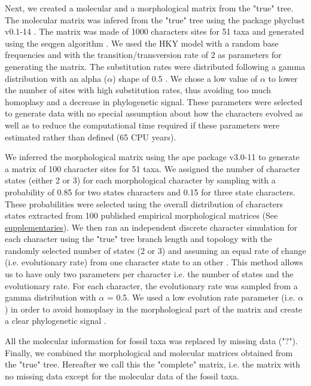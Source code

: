 \documentclass[12pt,letterpaper]{article}
\begin{document}
Next, we created a molecular and a morphological matrix from the "true" tree.
The molecular matrix was infered from the "true" tree using the package phyclust v0.1-14 \citep{chen2011}.
The matrix was made of 1000 characters sites for 51 taxa and generated using the seqgen algorithm \citep{ranbaut1997seqgen}.
We used the HKY model \citep{HKY85} with a random base frequencies and with the transition/transversion rate of 2 \citep{douadycomparison2003} as parameters for generating the matrix.
The substitution rates were distributed following a gamma distribution with an alpha ($\alpha$) shape of 0.5 \citep{yangamong-site1996}.
We chose a low value of $\alpha$ to lower the number of sites with high substitution rates, thus avoiding too much homoplasy and a decrease in phylogenetic signal.
These parameters were selected to generate data with no special assumption about how the characters evolved as well as to reduce the computational time required if these parameters were estimated rather than defined (65 CPU years).

We inferred the morphological matrix using the ape package v3.0-11 \citep{paradisape:2004} to generate a matrix of 100 character sites for 51 taxa.
We assigned the number of character states (either 2 or 3) for each morphological character by sampling with a probability of 0.85 for two states characters and 0.15 for three state characters.
These probabilities were selected using the overall distribution of characters states extracted from 100 published empirical morphological matrices (See \hyperref[supplementaries]{supplementaries}).
We then ran an independent discrete character simulation for each character using the "true" tree branch length and topology with the randomly selected number of states (2 or 3) and assuming an equal rate of change (i.e. evolutionary rate) from one character state to an other \citep{Pagel22011994}.
This method allows us to have only two parameters per character i.e. the number of states and the evolutionary rate.
For each character, the evolutionary rate was sampled from a gamma distribution with $\alpha$ = 0.5.
We used a low evolution rate parameter (i.e. $\alpha$) in order to avoid homoplasy in the morphological part of the matrix and create a clear phylogenetic signal \citep{wagner2000,davalosintegrating2014}.

All the molecular information for fossil taxa was replaced by missing data ("?").
Finally, we combined the morphological and molecular matrices obtained from the "true" tree.
Hereafter we call this the "complete" matrix, i.e. the matrix with no missing data except for the molecular data of the fossil taxa.
\end{document}
